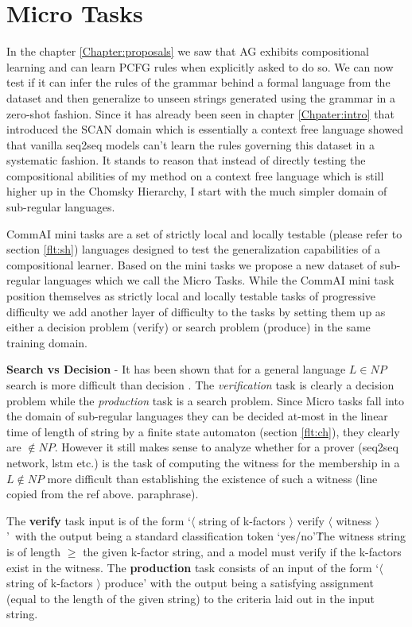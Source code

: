 \chapter{Micro Tasks}\label{Chapter:datasets}
In the chapter \ref{Chapter:proposals} we saw that AG exhibits compositional learning and can learn PCFG rules when explicitly asked to do so. We can now test if it can infer the rules of the grammar behind a formal language from the dataset and then generalize to unseen strings generated using the grammar in a zero-shot fashion. Since it has already been seen in chapter \ref{Chpater:intro} that \cite{Lake2017} introduced the SCAN domain which is essentially a context free language showed that vanilla seq2seq models can't learn the rules governing this dataset in a systematic fashion. It stands to reason that instead of directly testing the compositional abilities of my method on a context free language which is still higher up in the Chomsky Hierarchy, I start with the much simpler domain of sub-regular languages.

CommAI mini tasks \citep{Baroni2017} are a set of strictly local and locally testable (please refer to section \ref{flt:sh}) languages designed to test the generalization capabilities of a compositional learner. Based on the mini tasks we propose a new dataset of sub-regular languages which we call the Micro Tasks. While the CommAI mini task position themselves as strictly local and locally testable tasks of progressive difficulty we add another layer of difficulty to the tasks by setting them up as either a decision problem (verify) or search problem (produce) in the same training domain.

\textbf{Search vs Decision} - It has been shown that for a general language $L \in NP$ search is more difficult than decision \cite{Bellare1994}. The \textit{verification} task is clearly a decision problem while the \textit{production} task is a search problem. Since Micro tasks fall into the domain of sub-regular languages they can be decided at-most in the linear time of length of string by a finite state automaton (section \ref{flt:ch}), they clearly are $\notin NP$. However it still makes sense to analyze whether for a prover (seq2seq network, lstm etc.) is the task of computing the witness for the membership in a $L \notin NP$ more difficult than establishing the existence of such a witness (line copied from the ref above. paraphrase).

The \textbf{verify} task input is of the form \lq $\langle$ string of k-factors $\rangle$ verify $\langle$ witness $\rangle${}\rq\ with the output being a standard classification token \lq yes/no{}\rq\. The witness string is of length $\geq$ the given k-factor string, and a model must verify if the k-factors exist in the witness. The \textbf{production} task consists of an input of the form \lq $\langle$ string of k-factors $\rangle$ produce\rq{} with the output being a satisfying assignment (equal to the length of the given string) to the criteria laid out in the input string.

